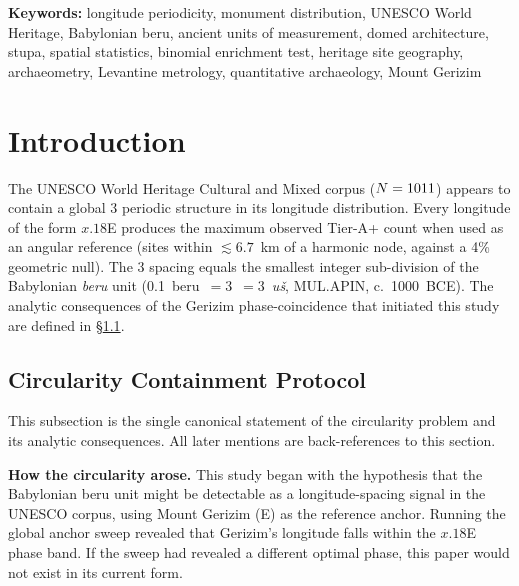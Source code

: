 \documentclass[12pt,a4paper]{article}
\begin{document}
\noindent\textbf{Keywords:}
longitude periodicity, monument distribution, UNESCO World Heritage,
Babylonian beru, ancient units of measurement, domed architecture,
stupa, spatial statistics, binomial enrichment test, heritage site geography,
archaeometry, Levantine metrology, quantitative archaeology, Mount Gerizim

\newpage


\section{Introduction}
\label{sec:introduction}

The UNESCO World Heritage Cultural and Mixed corpus ($N = 1011$)
appears to contain a global 3\textdegree{} periodic structure in its
longitude distribution.
Every longitude of the form $x.18$\textdegree{}E produces the maximum
observed Tier-A+ count when used as an angular reference (sites within
$\lesssim 6.7$~km of a harmonic node, against a 4\% geometric null).
The 3\textdegree{} spacing equals the smallest integer sub-division of
the Babylonian \textit{beru} unit
(0.1~beru~$= 3$\textdegree{}~$= 3$~\textit{u\v{s}}, MUL.APIN, c.~1000~BCE).
The analytic consequences of the Gerizim phase-coincidence
that initiated this study are defined in \S\ref{sec:circularity}.

\subsection{Circularity Containment Protocol}
\label{sec:circularity}

This subsection is the single canonical statement of the circularity problem
and its analytic consequences. All later mentions are back-references to
this section.

\textbf{How the circularity arose.}
This study began with the hypothesis that the Babylonian beru unit might be
detectable as a longitude-spacing signal in the UNESCO corpus, using Mount
Gerizim (\GerizimLon\textdegree{}E) as the reference anchor.
Running the global anchor sweep revealed that Gerizim's longitude
falls within the $x.18$\textdegree{}E phase band.
If the sweep had revealed a different optimal phase, this
paper would not exist in its current form.
\end{document}
